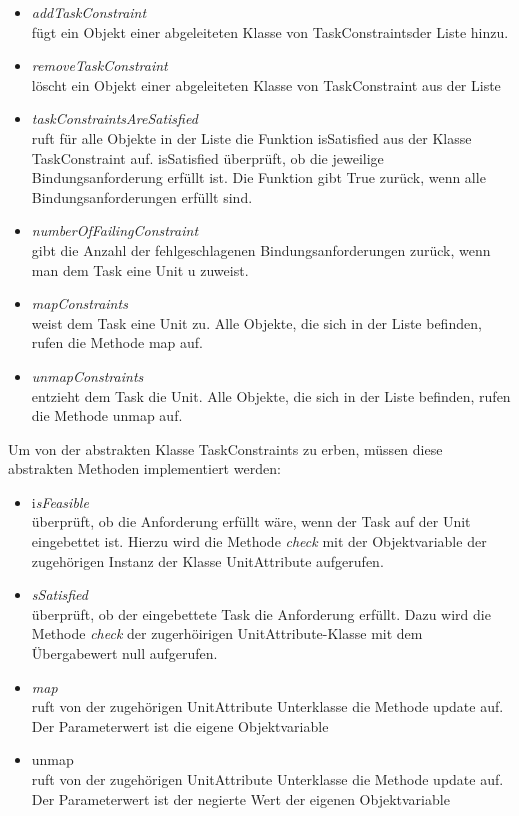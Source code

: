 \begin{itemize}
\item \textit{addTaskConstraint}\\
fügt ein Objekt einer abgeleiteten Klasse von TaskConstraintsder Liste hinzu. 
\item \textit{removeTaskConstraint}\\
löscht ein Objekt einer abgeleiteten Klasse von TaskConstraint aus der Liste
\item \textit{taskConstraintsAreSatisfied}\\
ruft für alle Objekte in der Liste die Funktion isSatisfied aus der Klasse TaskConstraint auf. isSatisfied überprüft, ob die jeweilige Bindungsanforderung erfüllt ist. Die Funktion gibt True zurück, wenn alle Bindungsanforderungen erfüllt sind.%
\item \textit{numberOfFailingConstraint}\\
gibt die Anzahl der fehlgeschlagenen Bindungsanforderungen zurück, wenn man dem Task eine Unit u zuweist. 
\item \textit{mapConstraints}\\
weist dem Task eine Unit zu. Alle Objekte, die sich in der Liste befinden, rufen die Methode map auf.
\item \textit{unmapConstraints}\\
entzieht dem Task die Unit. Alle Objekte, die sich in der Liste befinden, rufen die Methode unmap auf.
\end{itemize}

Um von der abstrakten Klasse TaskConstraints zu erben, müssen diese abstrakten Methoden implementiert werden:\\
\begin{itemize}
\item i\textit{sFeasible}\\
überprüft, ob die Anforderung erfüllt wäre, wenn der Task auf der Unit eingebettet ist. Hierzu wird die Methode \textit{check} mit der Objektvariable der zugehörigen Instanz der Klasse UnitAttribute aufgerufen.
\item \textit{sSatisfied}\\
überprüft, ob der eingebettete Task die Anforderung erfüllt. Dazu wird die Methode \textit{check} der zugerhöirigen UnitAttribute-Klasse mit dem Übergabewert null aufgerufen. 
\item \textit{map} \\
ruft von der zugehörigen UnitAttribute Unterklasse die Methode update auf. Der Parameterwert ist die eigene Objektvariable
\item \textit{}unmap\\
ruft von der zugehörigen UnitAttribute Unterklasse die Methode update auf. Der Parameterwert ist der negierte Wert der eigenen Objektvariable
\end{itemize}

